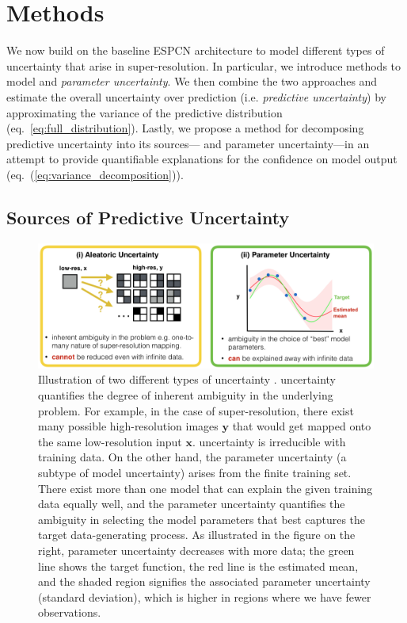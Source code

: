\section{Methods} 
We now build on the baseline ESPCN architecture to model different types of uncertainty that arise in super-resolution. In particular, we introduce methods to model \textit{} and \textit{parameter uncertainty}. We then combine the two approaches and estimate the overall uncertainty over prediction (i.e. \textit{predictive uncertainty}) by approximating the variance of the predictive distribution (eq.~\eqref{eq:full_distribution}). Lastly, we propose a method for decomposing predictive uncertainty into its sources--- and parameter uncertainty---in an attempt to provide quantifiable explanations for the confidence on model output (eq.~(\ref{eq:variance_decomposition})). 


\subsection{Sources of Predictive Uncertainty }
\begin{figure}[t]
	\includegraphics[width=0.95\linewidth]{chapter_3/figures/fig_intro.png}
	\centering	
	\caption{\footnotesize Illustration of two different types of uncertainty \cite{hora1996aleatory}.  uncertainty \cite{wang1996intrinsic} quantifies the degree of inherent ambiguity in the underlying problem. For example, in the case of super-resolution, there exist many possible high-resolution images $\textbf{y}$ that would get mapped onto the same low-resolution input $\textbf{x}$.  uncertainty is irreducible with training data. On the other hand, the parameter uncertainty \cite{draper1995assessment} (a subtype of model uncertainty) arises from the finite training set. There exist more than one model that can explain the given training data equally well, and the parameter uncertainty quantifies the ambiguity in selecting the model parameters that best captures the target data-generating process. As illustrated in the figure on the right, parameter uncertainty decreases with more data; the green line shows the target function, the red line is the estimated mean, and the shaded region signifies the associated parameter uncertainty (standard deviation), which is higher in regions where we have fewer observations.} 
	\label{fig:uncertainty_types}
\end{figure}


